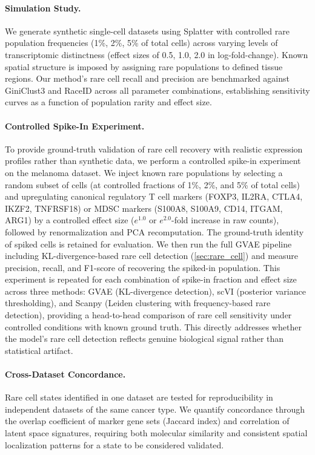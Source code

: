 \documentclass{article}
\begin{document}
\paragraph{Simulation Study.} We generate synthetic single-cell datasets using Splatter \cite{zappia2017splatter} with controlled rare population frequencies (1\%, 2\%, 5\% of total cells) across varying levels of transcriptomic distinctness (effect sizes of 0.5, 1.0, 2.0 in log-fold-change). Known spatial structure is imposed by assigning rare populations to defined tissue regions. Our method's rare cell recall and precision are benchmarked against GiniClust3 \cite{tsoucas2018giniclust2} and RaceID \cite{grun2015single} across all parameter combinations, establishing sensitivity curves as a function of population rarity and effect size.

\paragraph{Controlled Spike-In Experiment.} To provide ground-truth validation of rare cell recovery with realistic expression profiles rather than synthetic data, we perform a controlled spike-in experiment on the melanoma dataset. We inject known rare populations by selecting a random subset of cells (at controlled fractions of 1\%, 2\%, and 5\% of total cells) and upregulating canonical regulatory T cell markers (FOXP3, IL2RA, CTLA4, IKZF2, TNFRSF18) or MDSC markers (S100A8, S100A9, CD14, ITGAM, ARG1) by a controlled effect size ($e^{1.0}$ or $e^{2.0}$-fold increase in raw counts), followed by renormalization and PCA recomputation. The ground-truth identity of spiked cells is retained for evaluation. We then run the full GVAE pipeline including KL-divergence-based rare cell detection (\cref{sec:rare_cell}) and measure precision, recall, and F1-score of recovering the spiked-in population. This experiment is repeated for each combination of spike-in fraction and effect size across three methods: GVAE (KL-divergence detection), scVI (posterior variance thresholding), and Scanpy (Leiden clustering with frequency-based rare detection), providing a head-to-head comparison of rare cell sensitivity under controlled conditions with known ground truth. This directly addresses whether the model's rare cell detection reflects genuine biological signal rather than statistical artifact.

\paragraph{Cross-Dataset Concordance.} Rare cell states identified in one dataset are tested for reproducibility in independent datasets of the same cancer type. We quantify concordance through the overlap coefficient of marker gene sets (Jaccard index) and correlation of latent space signatures, requiring both molecular similarity and consistent spatial localization patterns for a state to be considered validated.
\end{document}

